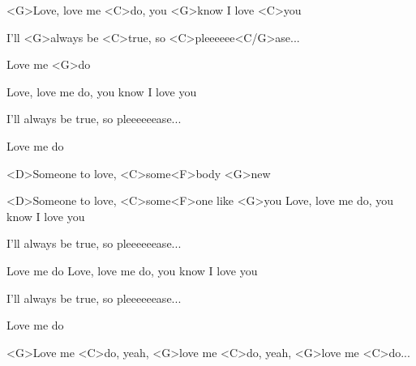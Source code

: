 
\zs

<G>Love, love me <C>do,
you <G>know I love <C>you

I'll <G>always be <C>true,
so <C>pleeeeee<C/G>ase...

Love me <G>do
\ks

\zs
Love, love me do,
you know I love you

I'll always be true,
so pleeeeeease...

Love me do
\ks
\zr

<D>Someone to love, <C>some<F>body <G>new

<D>Someone to love, <C>some<F>one like <G>you
\kr
\zs
Love, love me do,
you know I love you

I'll always be true,
so pleeeeeease...

Love me do
\ks
\zs
Love, love me do,
you know I love you

I'll always be true,
so pleeeeeease...

Love me do
\ks


<G>Love me <C>do, yeah, <G>love me <C>do,
yeah, <G>love me <C>do...

\kp
